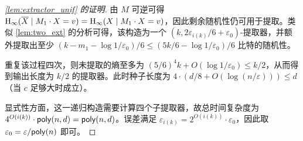 \begin{proof}[\cref{lem:extractor_unif} 的证明]
    由 $M$ 可逆可得 $\mathrm{H}_\infty(\overline{X} \mid M_1 \cdot X = v) = \mathrm{H}_\infty(X \mid M_1 \cdot X = v)$，因此剩余随机性仍可用于提取。类似 \cref{lem:two_ext} 的分析可得，该构造为一个 $(k, 2 \varepsilon_{i(k)}/6 + \varepsilon_0)$-提取器，并额外提取出至少 $(k - m_1 - \log 1 / \varepsilon_0)/6 \le (5k/6 - \log 1 / \varepsilon_0)/6$ 比特的随机性。

    重复该过程四次，则未提取的熵至多为 $(5/6)^4 k + O(\log 1 / \varepsilon_0) \le k/2$，从而得到输出长度为 $k/2$ 的提取器。此时种子长度为 $4 \cdot (d/8 + O(\log(n/\varepsilon))) \le d$（当 $c$ 足够大时成立）。

    显式性方面，这一递归构造需要计算四个子提取器，故总时间复杂度为 $4^{O(i(k))} \cdot \mathsf{poly}(n,d) = \mathsf{poly}(n,d)$。误差满足 $\varepsilon_{i(k)} = 2^{O(i(k))} \cdot \varepsilon_0$，因此取 $\varepsilon_0 = \varepsilon / \mathsf{poly}(n)$ 即可。
\end{proof}